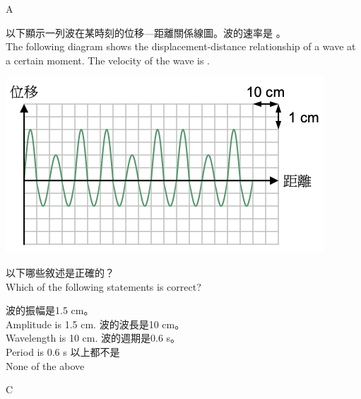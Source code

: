 {\begin{tasks}
        \task {}
    \end{tasks}

}{A}

{
    以下顯示一列波在某時刻的位移—距離關係線圖。波的速率是 。
    \\The following diagram shows the displacement-distance relationship of a wave at a certain moment. The velocity of the wave is .
    \par{\par\centering\includegraphics[width=.35\textwidth]{./img/ch1_earlyclass_wave_mc_2024-05-13-16-01-07.png}\par}
    以下哪些敘述是正確的？\\Which of the following statements is correct?

    \begin{tasks}
        \task 波的振幅是1.5 cm。\\Amplitude is 1.5 cm.
        \task 波的波長是10 cm。\\ Wavelength is 10 cm.
        \task 波的週期是0.6 s。\\Period is 0.6 s
        \task 以上都不是\\None of the above
    \end{tasks}

}{C}

